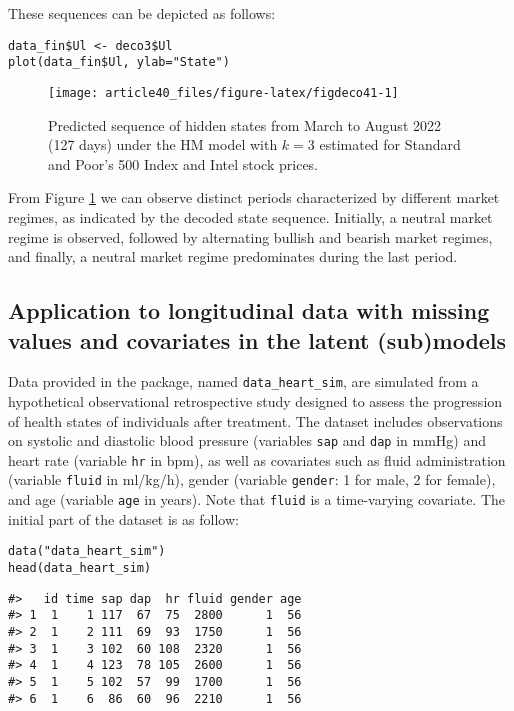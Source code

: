 These sequences can be depicted as follows:

\begin{verbatim}
data_fin$Ul <- deco3$Ul
plot(data_fin$Ul, ylab="State")
\end{verbatim}

\begin{figure}

{\centering \texttt{[image: article40\_files/figure-latex/figdeco41-1]} 

}

\caption{Predicted sequence of hidden states from March to August 2022  (127 days) under the HM model with $k=3$ estimated for Standard and Poor's 500 Index and Intel stock prices.}\label{fig:figdeco41}
\end{figure}

From Figure \ref{fig:figdeco41} we can observe distinct periods
characterized by different market regimes, as indicated by the decoded
state sequence. Initially, a neutral market regime is observed, followed
by alternating bullish and bearish market regimes, and finally, a
neutral market regime predominates during the last period.

\hypertarget{subsec:HMcontapp2}{%
\subsection{Application to longitudinal data with missing values and covariates in the latent (sub)models}\label{subsec:HMcontapp2}}

Data provided in the package, named \texttt{data\_heart\_sim}, are simulated from
a hypothetical observational retrospective study designed to assess the
progression of health states of individuals after treatment. The dataset
includes observations on systolic and diastolic blood pressure
(variables \texttt{sap} and \texttt{dap} in mmHg) and heart rate (variable \texttt{hr} in
bpm), as well as covariates such as fluid administration (variable
\texttt{fluid} in ml/kg/h), gender (variable \texttt{gender}: 1 for male, 2 for
female), and age (variable \texttt{age} in years). Note that \texttt{fluid} is a
time-varying covariate. The initial part of the dataset is as follow:

\begin{verbatim}
data("data_heart_sim")
head(data_heart_sim)
\end{verbatim}

\begin{verbatim}
#>   id time sap dap  hr fluid gender age
#> 1  1    1 117  67  75  2800      1  56
#> 2  1    2 111  69  93  1750      1  56
#> 3  1    3 102  60 108  2320      1  56
#> 4  1    4 123  78 105  2600      1  56
#> 5  1    5 102  57  99  1700      1  56
#> 6  1    6  86  60  96  2210      1  56
\end{verbatim}

